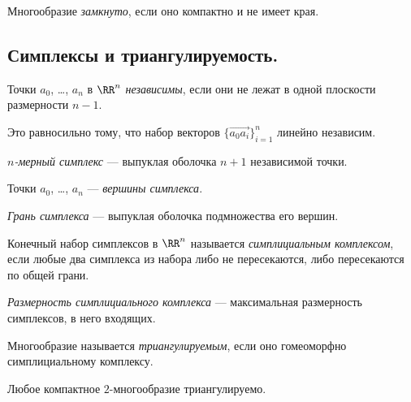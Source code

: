 \documentclass[12pt,a4paper]{article}
\begin{document}
    \begin{definition}
        Многообразие \emph{замкнуто}, если оно компактно и не имеет края.
    \end{definition}

    \subsection{Симплексы и триангулируемость.}

    \begin{definition}
        Точки $a_0$, \dots, $a_n$ в $\RR^n$ \emph{независимы}, если они не лежат в одной плоскости размерности $n-1$.
    \end{definition}

    \begin{remark}
        Это равносильно тому, что набор векторов $\{\overrightarrow{a_0a_i}\}_{i=1}^n$ линейно независим.
    \end{remark}

    \begin{definition}
        \emph{$n$-мерный симплекс} --- выпуклая оболочка $n+1$ независимой точки.

        Точки $a_0$, \dots, $a_n$ --- \emph{вершины симплекса}.

        \emph{Грань симплекса} --- выпуклая оболочка подмножества его вершин.
    \end{definition}

    \begin{definition}
        Конечный набор симплексов в $\RR^n$ называется \emph{симплициальным комплексом}, если любые два симплекса из набора либо не пересекаются, либо пересекаются по общей грани.
    \end{definition}

    \begin{definition}
        \emph{Размерность симплициального комплекса} --- максимальная размерность симплексов, в него входящих.
    \end{definition}

    \begin{definition}
        Многообразие называется \emph{триангулируемым}, если оно гомеоморфно симплициальному комплексу.
    \end{definition}

    \begin{theorem}
        Любое компактное $2$-многообразие триангулируемо.
    \end{theorem}
    
\end{document}
